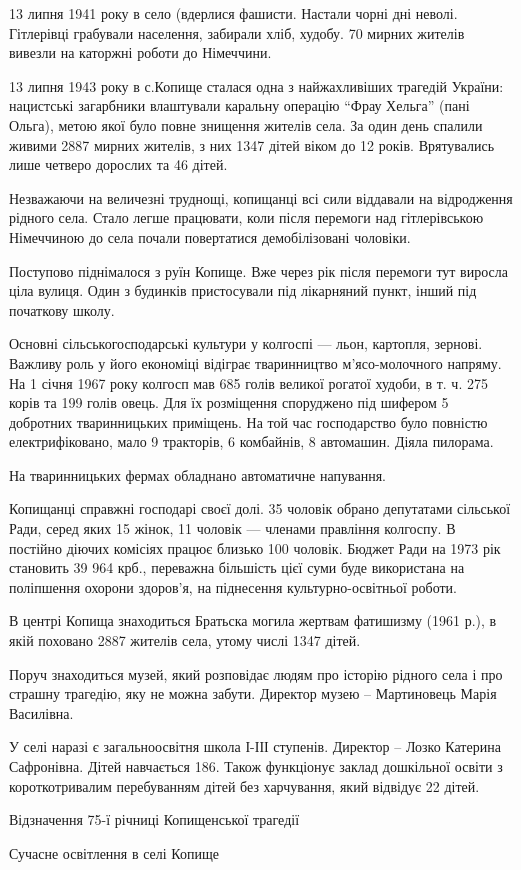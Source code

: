 13 липня 1941 року в село (вдерлися фашисти. Настали чорні дні неволі. Гітлерівці грабували населення, забирали хліб, худобу. 70 мирних жителів вивезли на каторжні роботи до Німеччини.

13 липня 1943 року в с.Копище сталася одна з найжахливіших трагедій України: нацистські загарбники влаштували каральну операцію “Фрау Хельга” (пані Ольга), метою якої було повне знищення жителів села. За один день спалили живими 2887 мирних жителів, з них 1347 дітей віком до 12 років. Врятувались лише четверо дорослих та 46 дітей.

Незважаючи на величезні труднощі, копищанці всі сили віддавали на відродження рідного села. Стало легше працювати, коли після перемоги над гітлерівською Німеччиною до села почали повертатися демобілізовані чоловіки.

Поступово піднімалося з руїн Копище. Вже через рік після перемоги тут виросла ціла вулиця. Один з будинків пристосували під лікарняний пункт, інший під початкову школу.

Основні сільськогосподарські культури у колгоспі — льон, картопля, зернові. Важливу роль у його економіці відіграє тваринництво м’ясо-молочного напряму. На 1 січня 1967 року колгосп мав 685 голів великої рогатої худоби, в т. ч. 275 корів та 199 голів овець. Для їх розміщення споруджено під шифером 5 добротних тваринницьких приміщень. На той час господарство було повністю електрифіковано, мало 9 тракторів, 6 комбайнів, 8 автомашин. Діяла пилорама.

На тваринницьких фермах обладнано автоматичне напування.

Копищанці справжні господарі своєї долі. 35 чоловік обрано депутатами сільської Ради, серед яких 15 жінок, 11 чоловік — членами правління колгоспу. В постійно діючих комісіях працює близько 100 чоловік. Бюджет Ради на 1973 рік становить 39 964 крб., переважна більшість цієї суми буде використана на поліпшення охорони здоров’я, на піднесення культурно-освітньої роботи.

В центрі Копища знаходиться Братьска могила жертвам фатишизму (1961 р.), в якій поховано 2887 жителів села, утому числі 1347 дітей.

Поруч знаходиться музей, який розповідає людям про історію рідного села і про страшну трагедію, яку не можна забути. Директор музею – Мартиновець Марія Василівна.

У селі наразі є загальноосвітня школа І-ІІІ ступенів. Директор – Лозко Катерина Сафронівна. Дітей навчається 186. Також функціонує заклад дошкільної освіти з короткотривалим перебуванням дітей без харчування, який відвідує 22 дітей.

Відзначення 75-ї річниці Копищенської трагедії

Сучасне освітлення в селі Копище

